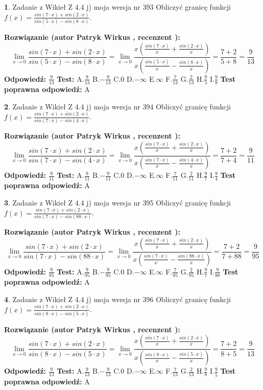 \documentclass[12pt, a4paper]{article}
\theoremstyle{definition} %
\newtheorem{zad}{}
\newcommand{\zadStart}[1]{\begin{zad}#1\newline}
\newcommand{\zadStop}{\end{zad}}
\newcommand{\rozwStart}[2]{\noindent \textbf{Rozwiązanie (autor #1 , recenzent #2): }\newline}
\newcommand{\rozwStop}{\newline}
\newcommand{\odpStart}{\noindent \textbf{Odpowiedź:}\newline}
\newcommand{\odpStop}{\newline}
\newcommand{\testStart}{\noindent \textbf{Test:}\newline}
\newcommand{\testStop}{\newline}
\newcommand{\kluczStart}{\noindent \textbf{Test poprawna odpowiedź:}\newline}
\newcommand{\kluczStop}{\newline}
\begin{document}
\zadStart{Zadanie z Wikieł Z 4.4 j) moja wersja nr 393}
Obliczyć granicę funkcji $f(x)=\frac{sin(7\cdot x) +sin(2\cdot x)}{sin(5\cdot x) -sin(8\cdot x)}$.
\zadStop
\rozwStart{Patryk Wirkus}{}
$$\lim\limits_{x\to 0}\frac{sin(7\cdot x) +sin(2\cdot x)}{sin(5\cdot x) -sin(8\cdot x)}=\lim\limits_{x\to 0}\frac{x(\frac{sin(7\cdot x)}{x}+\frac{sin(2\cdot x)}{x})}{x(\frac{sin(5\cdot x)}{x}-\frac{sin(8\cdot x)}{x})}=\frac{7+2}{5+8} = \frac{9}{13}$$
\rozwStop
\odpStart
$\frac{9}{13}$
\odpStop
\testStart
A.$\frac{9}{13}$
B.$-\frac{9}{13}$
C.$0$
D.$-\infty$
E.$\infty$
F.$\frac{7}{13}$
G.$\frac{2}{13}$
H.$\frac{9}{5}$
I.$\frac{9}{8}$
\testStop
\kluczStart
A
\kluczStop



\zadStart{Zadanie z Wikieł Z 4.4 j) moja wersja nr 394}
Obliczyć granicę funkcji $f(x)=\frac{sin(7\cdot x) +sin(2\cdot x)}{sin(7\cdot x) -sin(4\cdot x)}$.
\zadStop
\rozwStart{Patryk Wirkus}{}
$$\lim\limits_{x\to 0}\frac{sin(7\cdot x) +sin(2\cdot x)}{sin(7\cdot x) -sin(4\cdot x)}=\lim\limits_{x\to 0}\frac{x(\frac{sin(7\cdot x)}{x}+\frac{sin(2\cdot x)}{x})}{x(\frac{sin(7\cdot x)}{x}-\frac{sin(4\cdot x)}{x})}=\frac{7+2}{7+4} = \frac{9}{11}$$
\rozwStop
\odpStart
$\frac{9}{11}$
\odpStop
\testStart
A.$\frac{9}{11}$
B.$-\frac{9}{11}$
C.$0$
D.$-\infty$
E.$\infty$
F.$\frac{7}{11}$
G.$\frac{2}{11}$
H.$\frac{9}{7}$
I.$\frac{9}{4}$
\testStop
\kluczStart
A
\kluczStop



\zadStart{Zadanie z Wikieł Z 4.4 j) moja wersja nr 395}
Obliczyć granicę funkcji $f(x)=\frac{sin(7\cdot x) +sin(2\cdot x)}{sin(7\cdot x) -sin(88\cdot x)}$.
\zadStop
\rozwStart{Patryk Wirkus}{}
$$\lim\limits_{x\to 0}\frac{sin(7\cdot x) +sin(2\cdot x)}{sin(7\cdot x) -sin(88\cdot x)}=\lim\limits_{x\to 0}\frac{x(\frac{sin(7\cdot x)}{x}+\frac{sin(2\cdot x)}{x})}{x(\frac{sin(7\cdot x)}{x}-\frac{sin(88\cdot x)}{x})}=\frac{7+2}{7+88} = \frac{9}{95}$$
\rozwStop
\odpStart
$\frac{9}{95}$
\odpStop
\testStart
A.$\frac{9}{95}$
B.$-\frac{9}{95}$
C.$0$
D.$-\infty$
E.$\infty$
F.$\frac{7}{95}$
G.$\frac{2}{95}$
H.$\frac{9}{7}$
I.$\frac{9}{88}$
\testStop
\kluczStart
A
\kluczStop



\zadStart{Zadanie z Wikieł Z 4.4 j) moja wersja nr 396}
Obliczyć granicę funkcji $f(x)=\frac{sin(7\cdot x) +sin(2\cdot x)}{sin(8\cdot x) -sin(5\cdot x)}$.
\zadStop
\rozwStart{Patryk Wirkus}{}
$$\lim\limits_{x\to 0}\frac{sin(7\cdot x) +sin(2\cdot x)}{sin(8\cdot x) -sin(5\cdot x)}=\lim\limits_{x\to 0}\frac{x(\frac{sin(7\cdot x)}{x}+\frac{sin(2\cdot x)}{x})}{x(\frac{sin(8\cdot x)}{x}-\frac{sin(5\cdot x)}{x})}=\frac{7+2}{8+5} = \frac{9}{13}$$
\rozwStop
\odpStart
$\frac{9}{13}$
\odpStop
\testStart
A.$\frac{9}{13}$
B.$-\frac{9}{13}$
C.$0$
D.$-\infty$
E.$\infty$
F.$\frac{7}{13}$
G.$\frac{2}{13}$
H.$\frac{9}{8}$
I.$\frac{9}{5}$
\testStop
\kluczStart
A
\kluczStop
\end{document}
